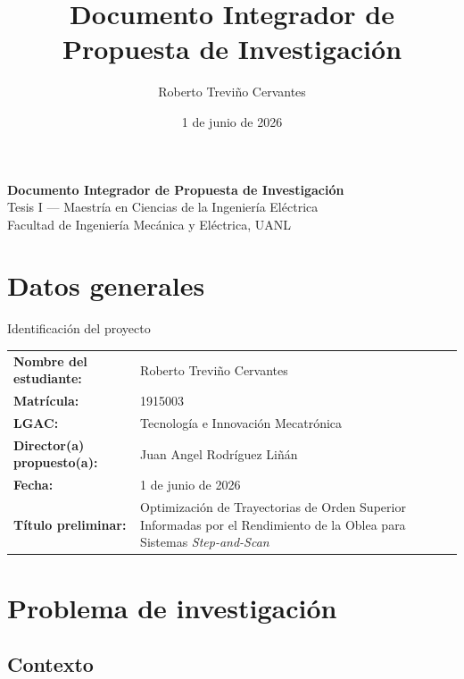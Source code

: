 \documentclass[11pt]{article}
\title{Documento Integrador de Propuesta de Investigación}
\author{Roberto Treviño Cervantes}
\date{1 de junio de 2026}
\begin{document}
\begin{center}
{\LARGE \bfseries Documento Integrador de Propuesta de Investigación} \\[4pt]
{\large Tesis I --- Maestría en Ciencias de la Ingeniería Eléctrica} \\[2pt]
{\normalsize Facultad de Ingeniería Mecánica y Eléctrica, UANL}
\end{center}

\vspace{4pt}

\section*{Datos generales}

\begin{infobox}{Identificación del proyecto}
\begin{tabular}{@{}p{4.8cm} L{9.5cm}@{}}
\textbf{Nombre del estudiante:}    & Roberto Treviño Cervantes \\
\textbf{Matrícula:}                & 1915003 \\
\textbf{LGAC:}                     & Tecnología e Innovación Mecatrónica \\
\textbf{Director(a) propuesto(a):} & Juan Angel Rodríguez Liñán\\
\textbf{Fecha:}                    & 1 de junio de 2026 \\
\textbf{Título preliminar:} &
Optimización de Trayectorias de Orden Superior Informadas por el Rendimiento de la Oblea para Sistemas \textit{Step-and-Scan} \\
\end{tabular}
\end{infobox}

\section{Problema de investigación}

\subsection*{Contexto}
\end{document}
